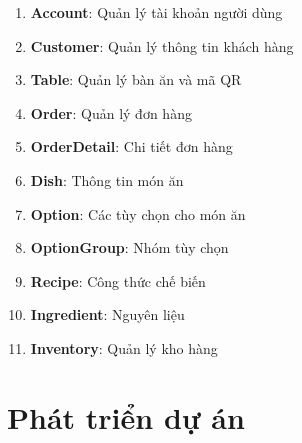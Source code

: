 \documentclass[a4paper]{article}
\begin{document}
    \begin{enumerate}
        \item \textbf{Account}: Quản lý tài khoản người dùng
        \item \textbf{Customer}: Quản lý thông tin khách hàng
        \item \textbf{Table}: Quản lý bàn ăn và mã QR
        \item \textbf{Order}: Quản lý đơn hàng
        \item \textbf{OrderDetail}: Chi tiết đơn hàng
        \item \textbf{Dish}: Thông tin món ăn
        \item \textbf{Option}: Các tùy chọn cho món ăn
        \item \textbf{OptionGroup}: Nhóm tùy chọn
        \item \textbf{Recipe}: Công thức chế biến
        \item \textbf{Ingredient}: Nguyên liệu
        \item \textbf{Inventory}: Quản lý kho hàng
    \end{enumerate}

\newpage
\section{Phát triển dự án}
\end{document}
